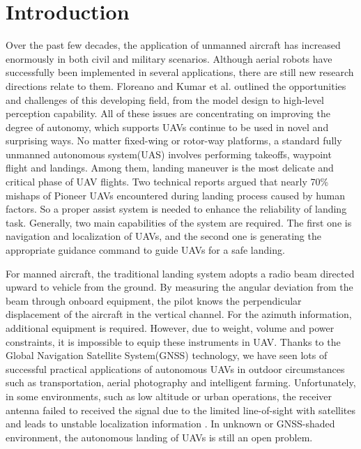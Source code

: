 \section{Introduction}
\label{intro}
Over the past few decades, the application of unmanned aircraft has increased enormously in both civil and military scenarios. Although aerial robots have successfully been implemented in several applications, there are still new research directions relate to them. Floreano \cite{floreano2015science} and Kumar et al. \cite{kushleyev2013towards} outlined the opportunities and challenges of this developing field, from the model design to high-level perception capability. All of these issues are concentrating on improving the degree of autonomy, which supports UAVs continue to be used in novel and surprising ways.
No matter fixed-wing or rotor-way platforms, a standard fully unmanned autonomous system(UAS) involves performing takeoffs, waypoint flight and landings. Among them, landing maneuver is the most delicate and critical phase of UAV flights. Two technical reports \cite{manning2004role} argued that nearly 70\% mishaps of Pioneer UAVs encountered during landing process caused by human factors. So a proper assist system is needed to enhance the reliability of landing task. Generally, two main capabilities of the system are required. The first one is navigation and localization of UAVs, and the second one is generating the appropriate guidance command to guide UAVs for a safe landing. 

For manned aircraft, the traditional landing system adopts a radio beam directed upward to vehicle from the ground. By measuring the angular deviation from the beam through onboard equipment, the pilot knows the perpendicular displacement of the aircraft in the vertical channel. For the azimuth information, additional equipment is required. However, due to weight, volume and power constraints, it is impossible to equip these instruments in UAV. Thanks to the Global Navigation Satellite System(GNSS) technology, we have seen lots of successful practical applications of autonomous UAVs in outdoor circumstances such as transportation, aerial photography and intelligent farming. Unfortunately, in some environments, such as low altitude or urban operations, the receiver antenna failed to received the signal due to the limited line-of-sight with satellites and leads to unstable localization information \cite{farrell1998gps}. In unknown or GNSS-shaded environment, the autonomous landing of UAVs is still an open problem. 

